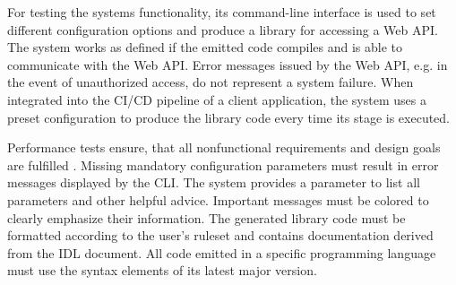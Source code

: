 For testing the systems functionality, its command-line interface is used to set different configuration options and produce a library for accessing a Web API. The system works as defined if the emitted code compiles and is able to communicate with the Web API. Error messages issued by the Web API, e.g. in the event of unauthorized access, do not represent a system failure. When integrated into the CI/CD pipeline of a client application, the system uses a preset configuration to produce the library code every time its stage is executed.

Performance tests ensure, that all nonfunctional requirements and design goals are fulfilled \cite{bruegge_object-oriented_2010}. Missing mandatory configuration parameters must result in error messages displayed by the \ac{CLI}. The system provides a parameter to list all parameters and other helpful advice. Important messages must be colored to clearly emphasize their information. The generated library code must be formatted according to the user's ruleset and contains documentation derived from the \ac{IDL} document. All code emitted in a specific programming language must use the syntax elements of its latest major version.
